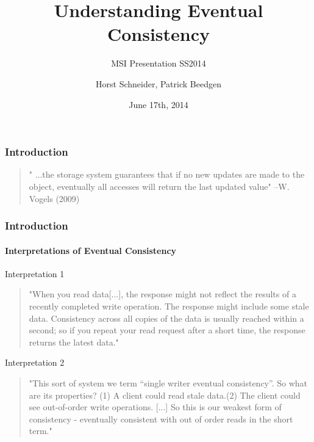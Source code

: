 \documentclass[11pt]{beamer}
\author{Horst Schneider, Patrick Beedgen}
\title{Understanding Eventual Consistency}
\subtitle{MSI Presentation SS2014}
\institute{Hochschule Mannheim}
\date{June 17th, 2014}
\begin{document}
\begin{frame}
\titlepage
\end{frame}

\begin{frame}
\frametitle{Introduction}
\begin{quotation}
" ...the 
storage system guarantees that if no 
new updates are made to the object, 
eventually all accesses will return the 
last updated value"
\linebreak
--W. Vogels (2009)
\end{quotation}
\end{frame}



\begin{frame}
\frametitle{Introduction}
\framesubtitle{Interpretations of Eventual Consistency}
\begin{footnotesize}

\begin{block}{Interpretation 1}
\begin{quotation}
"When you read data[...], the response might not reflect the results of a recently completed write operation. The response might include some stale data. Consistency across all copies of the data is usually reached within a second; so if you repeat your read request after a short time, the response returns the latest data."
\end{quotation}
\end{block}

\begin{block}{Interpretation 2}
\begin{quotation}
"This sort of system we term “single writer eventual consistency”.  So what are its properties? \linebreak (1) A client could read stale data.\linebreak (2) The client could see out-of-order write operations. [...] So this is our weakest form of consistency - eventually consistent with out of order reads in the short term."
\end{quotation}
\end{block}
\end{footnotesize}
\end{frame}
\end{document}
